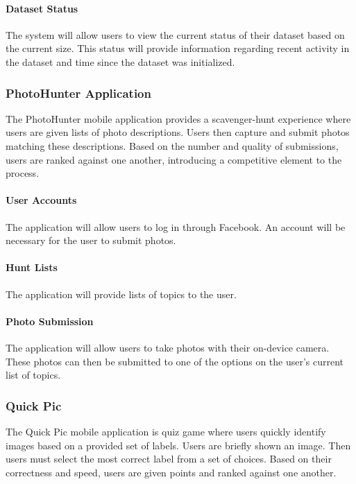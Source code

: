 \documentclass{article}
\begin{document}
  \paragraph{Dataset Status}
  The system will allow users to view the current status of their dataset based
  on the current size. This status will provide information regarding recent
  activity in the dataset and time since the dataset was initialized.

\subsubsection{PhotoHunter Application}
The PhotoHunter mobile application provides a scavenger-hunt experience where
users are given lists of photo descriptions. Users then capture and submit
photos matching these descriptions. Based on the number and quality of
submissions, users are ranked against one another, introducing a competitive
element to the process.

  \paragraph{User Accounts}
  The application will allow users to log in through Facebook. An account will
  be necessary for the user to submit photos.

  \paragraph{Hunt Lists}
  The application will provide lists of topics to the user.

  \paragraph{Photo Submission}
  The application will allow users to take photos with their on-device camera.
  These photos can then be submitted to one of the options on the user's current
  list of topics.

\subsubsection{Quick Pic}
The Quick Pic mobile application is quiz game where users quickly identify
images based on a provided set of labels. Users are briefly shown an image.
Then users must select the most correct label from a set of choices. Based on
their correctness and speed, users are given points and ranked against one
another.
\end{document}
